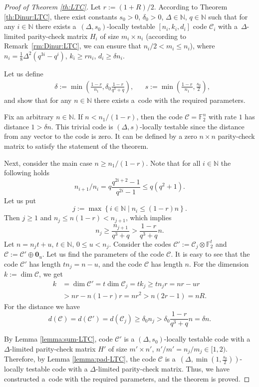 \documentclass[conference]{IEEEtran}
\let\le\leqslant
\let\ge\geqslant
\theoremstyle{plain}
\theoremstyle{definition}
\theoremstyle{remark}
\newcommand{\NN}{\mathbb{N}}
\newcommand{\cC}{\mathcal{C}}
\newcommand{\F}{\mathbb{F}}
\begin{document}
\begin{proof}[Proof of Theorem \ref{th:LTC}]
    Let $r := (1 + R) / 2$. According to Theorem \ref{th:Dinur:LTC}, there exist constants $s_0 > 0$, $\delta_0 > 0$, ${\Delta \in \NN}$, ${q \in \NN}$ such that for any $i \in \NN$ there exists a~$(\Delta, s_0)$-locally testable $[n_i, k_i, d_i]$ code $\cC_i$ with a~$\Delta$-limited parity-check matrix $H_i$ of size $m_i \times n_i$ (according to Remark~\ref{rm:Dinur:LTC}, we can ensure that $n_i / 2 < m_i \le n_i$), where $n_i = \frac{1}{8} \Delta^2 (q^{3i} - q^i)$, $k_i \ge r n_i$, $d_i \ge \delta n_i$.

    Let us define 
    \begin{align*}
        &\delta := \min \left( \frac{1 - r}{n_1}, \delta_0 \frac{1-r}{q^3 + q} \right), && s := \min \left( \frac{1 - r}{n_1}, \frac{s_0}{2} \right),
    \end{align*}
    and show that for any $n \in \NN$ there exists a~code with the required parameters.
    
    Fix an arbitrary $n \in \NN$.
    If $n < n_1 / (1 - r)$, then the code $\cC = \F_2^n$ with rate $1$ has distance $1 > \delta n$. This trivial code is $(\Delta, s)$-locally testable since the distance from any vector to the code is zero. It can be defined by a zero $n\times n$ parity-check matrix to satisfy the statement of the theorem.
    
    Next, consider the main case $n \ge n_1 / (1 - r)$. 
    Note that for all $i \in \NN$ the following holds
    \[
    n_{i+1} / n_i = q \frac{q^{2i+2} - 1}{q^{2i} - 1} \leq q (q^2 + 1).
    \]
    Let us put
    \[
    j := \max \left\{ i \in \NN \mid n_i \le (1 - r) n \right\}.
    \] 
    Then $j \ge 1$ and $n_j \le n (1 - r) < n_{j+1}$, which implies \[
        n_j \ge \frac{n_{j+1}}{q^3 + q} > \frac{1 - r}{q^3 + q} n.
    \] 
    Let $n = n_j t + u$, $t \in \NN$, $0 \le u < n_j$. 
    Consider the codes $\cC' := \cC_j\otimes \F_2^t$ and $\cC := \cC' \oplus \mathbf{0}_u$. 
    Let us find the parameters of the code $\cC$.
    It is easy to see that the code $\cC'$ has length $tn_j = n - u$, and the code $\cC$ has length $n$.
    For the dimension $k := \dim \cC$, we get
    \begin{align*}
    k &= \dim \cC' = t \dim \cC_j = t k_j 
    \ge t n_j r = n r - u r\\
    & > n r - n (1 - r) r = nr^2 > n (2r - 1) = n R.
    \end{align*}
    For the distance we have 
    \[
    d(\cC) = d(\cC') = d(\cC_j) \ge \delta_0 n_j > \delta_0 \frac{1 - r}{q^3 + q} n = \delta n.
    \]

    By Lemma \ref{lemma:sum-LTC}, code $\cC'$ is a $(\Delta, s_0)$-locally testable code with a $\Delta$-limited parity-check matrix $H'$ of size $m' \times n'$, $n' / m' = n_j / m_j \in [1, 2)$. Therefore, by Lemma \ref{lemma:pad-LTC}, the code $\cC$ is a~$(\Delta, \min(1, \frac{s_0}{2}))$-locally testable code with a $\Delta$-limited parity-check matrix.
    Thus, we have constructed a~code with the required parameters, and the theorem is proved.
\end{proof}
\end{document}
